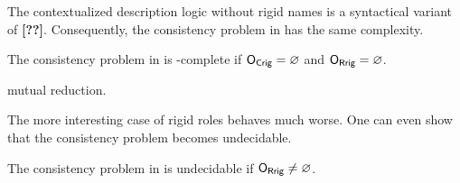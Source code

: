 \begin{example}\label{ex:alcalc-plus}
  
\end{example}

The contextualized description logic \ALCALCplus without rigid names is a syntactical variant of
\klarALC \textbf{[??]}. Consequently, the consistency problem in \ALCALCplus has
the same complexity.

\begin{theorem}\label{thm:alcalcplus-without-rigid-twoexptime}
  The consistency problem in \ALCALCplus is \TwoExpTime-complete if $\mathsf{O_{Crig}} = \varnothing$ and
  $\mathsf{O_{Rrig}} = \varnothing$.
\end{theorem}

mutual reduction. 

\missingproof


The more interesting case of rigid roles behaves much worse. One can even show that the consistency
problem becomes undecidable.

\begin{theorem}\label{thm:elalcplus-with-rigid-undecidable}
  The consistency problem in \ELALCplus is undecidable if $\mathsf{O_{Rrig}} \neq \varnothing$.
\end{theorem}


